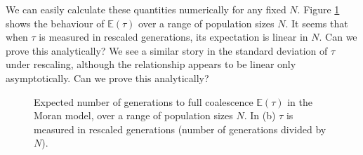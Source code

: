 \documentclass{article}
\newcommand{\E}{\mathbb{E}}
\begin{document}
We can easily calculate these quantities numerically for any fixed $N$. Figure \ref{fig:moran_coal} shows the behaviour of $\E(\tau)$ over a range of population sizes $N$. It seems that when $\tau$ is measured in rescaled generations, its expectation is linear in $N$. Can we prove this analytically? We see a similar story in the standard deviation of $\tau$ under rescaling, although the relationship appears to be linear only asymptotically. Can we prove this analytically?
\begin{figure}
  \centering
  \caption{Expected number of generations to full coalescence $\E(\tau)$ in the Moran model, over a range of population sizes $N$. In (b) $\tau$ is measured in rescaled generations (number of generations divided by $N$).}
  \label{fig:moran_coal}
\end{figure}
\end{document}
